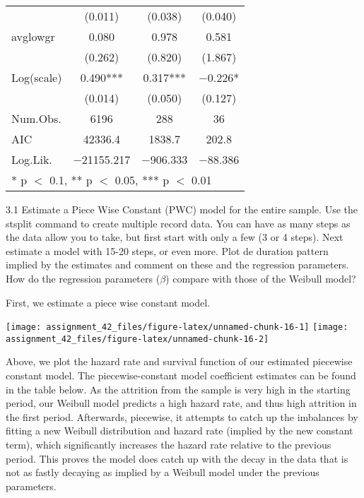\documentclass[
]{article}
\begin{document}
\begin{table}[!h]
\begin{tabular}[t]{lccc}
 & (\num{0.011}) & (\num{0.038}) & (\num{0.040})\\
avglowgr & \num{0.080} & \num{0.978} & \num{0.581}\\
 & (\num{0.262}) & (\num{0.820}) & (\num{1.867})\\
Log(scale) & \num{0.490}*** & \num{0.317}*** & \num{-0.226}*\\
 & (\num{0.014}) & (\num{0.050}) & (\num{0.127})\\
\midrule
Num.Obs. & \num{6196} & \num{288} & \num{36}\\
AIC & \num{42336.4} & \num{1838.7} & \num{202.8}\\
Log.Lik. & \num{-21155.217} & \num{-906.333} & \num{-88.386}\\
\bottomrule
\multicolumn{4}{l}{\rule{0pt}{1em}* p $<$ 0.1, ** p $<$ 0.05, *** p $<$ 0.01}\\
\end{tabular}
\end{table}

\clearpage

3.1 Estimate a Piece Wise Constant (PWC) model for the entire sample.
Use the stsplit command to create multiple record data. You can have as
many steps as the data allow you to take, but first start with only a
few (3 or 4 steps). Next estimate a model with 15-20 steps, or even
more. Plot de duration pattern implied by the estimates and comment on
these and the regression parameters. How do the regression parameters
(\(\beta\)) compare with those of the Weibull model?

First, we estimate a piece wise constant model.

\texttt{[image: assignment\_42\_files/figure-latex/unnamed-chunk-16-1]}
\texttt{[image: assignment\_42\_files/figure-latex/unnamed-chunk-16-2]}

Above, we plot the hazard rate and survival function of our estimated
piecewise constant model. The piecewise-constant model coefficient
estimates can be found in the table below. As the attrition from the
sample is very high in the starting period, our Weibull model predicts a
high hazard rate, and thus high attrition in the first period.
Afterwards, piecewise, it attempts to catch up the imbalances by fitting
a new Weibull distribution and hazard rate (implied by the new constant
term), which significantly increases the hazard rate relative to the
previous period. This proves the model does catch up with the decay in
the data that is not as fastly decaying as implied by a Weibull model
under the previous parameters.
\end{document}

